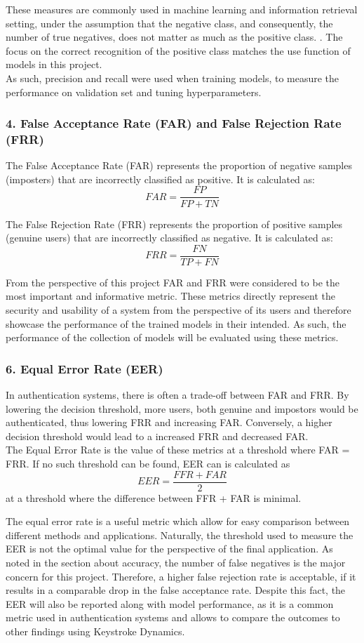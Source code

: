 These measures are commonly used in machine learning and information retrieval setting, under the assumption that the negative class, and consequently, the number of true negatives, does not matter as much as the positive class. . The focus on the correct recognition of the positive class matches the use function of models in this project.\\
As such, precision and recall were used when training models, to measure the performance on validation set and tuning hyperparameters.  

\subsubsection{4. False Acceptance Rate (FAR) and False Rejection Rate (FRR)}
The False Acceptance Rate (FAR) represents the proportion of negative samples (imposters) that are incorrectly classified as positive. It is calculated as:
\[
FAR = \frac{FP}{FP + TN}
\]

The False Rejection Rate (FRR) represents the proportion of positive samples (genuine users) that are incorrectly classified as negative. It is calculated as:
\[
FRR = \frac{FN}{TP + FN}
\]

From the perspective of this project FAR and FRR were considered to be the most important and informative metric. These metrics directly represent the security and usability of a system from the perspective of its users and therefore showcase the performance of the trained models in their intended. As such, the performance of the collection of models will be evaluated using these metrics. 

\subsubsection{6. Equal Error Rate (EER)}
In authentication systems, there is often a trade-off between FAR and FRR. By lowering the decision threshold, more users, both genuine and impostors would be authenticated, thus lowering FRR and increasing FAR. Conversely, a higher decision threshold would lead to a increased FRR and decreased FAR. \\
The Equal Error Rate is the value of these metrics at a threshold where FAR = FRR. If no such threshold can be found, EER can is calculated as  
\[
EER = \frac{FFR + FAR}{2}
\]
at a threshold where the difference between FFR + FAR is minimal.

The equal error rate is a useful metric which allow for easy comparison between different methods and applications. Naturally, the threshold used to measure the EER is not the optimal value for the perspective of the final application. As noted in the section about accuracy, the number of false negatives is the major concern for this project. Therefore, a higher false rejection rate is acceptable, if it results in a comparable drop in the false acceptance rate. Despite this fact, the EER will also be reported along with model performance, as it is a common metric used in authentication systems and allows to compare the outcomes to other findings using Keystroke Dynamics.



